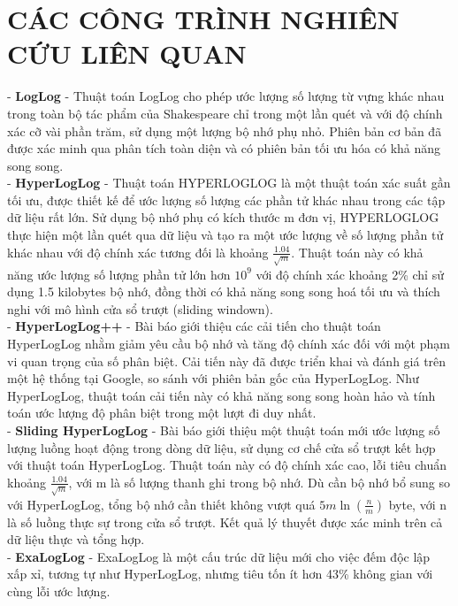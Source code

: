 \documentclass[letterpaper,13pt]{article}
\theoremstyle{mytheor}
\begin{document}
\section{CÁC CÔNG TRÌNH NGHIÊN CỨU LIÊN QUAN}
- \textbf{LogLog} - \cite{durand2003loglog} Thuật toán LogLog cho phép ước lượng số lượng từ vựng khác nhau trong toàn bộ tác phẩm của Shakespeare chỉ trong một lần quét và với độ chính xác 
cỡ vài phần trăm, sử dụng một lượng bộ nhớ phụ nhỏ. Phiên bản cơ bản đã được xác minh qua phân tích toàn diện và có phiên bản tối ưu hóa có khả năng song song.\\
- \textbf{HyperLogLog} - \cite{flajolet2007hyperloglog} Thuật toán HYPERLOGLOG là một thuật toán xác suất gần tối ưu, được thiết kế để ước lượng số lượng các phần tử khác nhau trong các tập dữ liệu rất lớn. 
Sử dụng bộ nhớ phụ có kích thước m đơn vị, HYPERLOGLOG thực hiện một lần quét qua dữ liệu và tạo ra một ước lượng về số lượng phần tử khác nhau với độ chính xác tương đối là khoảng $\frac{1.04}{\sqrt{m}}$. 
Thuật toán này có khả năng ước lượng số lượng phần tử lớn hơn $10^9$ với độ chính xác khoảng 2\% chỉ sử dụng 1.5 kilobytes bộ nhớ, đồng thời có khả năng song song hoá tối ưu 
và thích nghi với mô hình cửa sổ trượt (sliding windown).\\
- \textbf{HyperLogLog++} - \cite{heule2013hyperloglog} Bài báo giới thiệu các cải tiến cho thuật toán HyperLogLog nhằm giảm yêu cầu bộ nhớ và tăng độ 
chính xác đối với một phạm vi quan trọng của số phân biệt. Cải tiến này đã được triển khai và đánh giá trên một hệ thống tại Google, so sánh với 
phiên bản gốc của HyperLogLog. Như HyperLogLog, thuật toán cải tiến này có khả năng song song hoàn hảo và tính toán ước lượng độ phân biệt trong 
một lượt đi duy nhất. \\
- \textbf{Sliding HyperLogLog} - \cite{chabchoub2010sliding} Bài báo giới thiệu một thuật toán mới ước lượng số lượng luồng hoạt động trong dòng dữ liệu, sử dụng cơ chế cửa sổ trượt kết hợp với 
thuật toán HyperLogLog. Thuật toán này có độ chính xác cao, lỗi tiêu chuẩn khoảng $\frac{1.04}{\sqrt{m}}$, với m là số lượng thanh ghi trong bộ nhớ. Dù cần bộ nhớ bổ sung 
so với HyperLogLog, tổng bộ nhớ cần thiết không vượt quá $5m\ln(\frac{n}{m})$ byte, với n là số luồng thực sự trong cửa sổ trượt. Kết quả lý thuyết được xác minh trên cả dữ liệu thực 
và tổng hợp.\\
- \textbf{ExaLogLog} - \cite{ertl2024exaloglog} ExaLogLog là một cấu trúc dữ liệu mới cho việc đếm độc lập xấp xỉ, tương tự như HyperLogLog, nhưng tiêu tốn ít hơn 43\% không gian với cùng lỗi ước lượng.\\
\newpage
\end{document}
